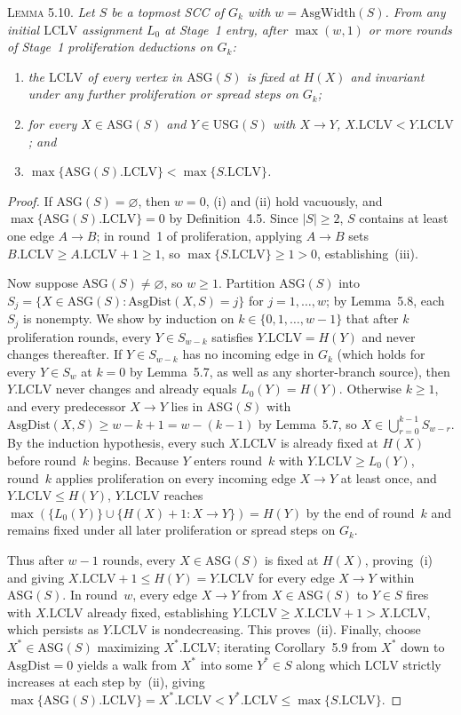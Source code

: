 \documentclass[sigconf,nonacm]{acmart}
\newcommand{\lclv}{\mathrm{LCLV}}
\newcommand{\usg}{\mathrm{USG}}
\newcommand{\asg}{\mathrm{ASG}}
\newcommand{\asgdist}{\mathrm{AsgDist}}
\newcommand{\asgwidth}{\mathrm{AsgWidth}}
\newcommand{\phead}[1]{\par\noindent\textsc{#1.}\enspace}
\begin{document}
\phead{Lemma 5.10}%
\emph{Let \(S\) be a topmost SCC of \(G_k\) with \(w=\asgwidth(S)\).
From any initial \(\lclv\) assignment \(L_0\) at Stage~1 entry, after
\(\max(w,1)\) or more rounds of Stage~1 proliferation deductions on
\(G_k\):}
\begin{enumerate}
  \item[\emph{(i)}] \emph{the \(\lclv\) of every vertex in \(\asg(S)\) is
    fixed at \(H(X)\) and invariant under any further proliferation or
    spread steps on \(G_k\);}
  \item[\emph{(ii)}] \emph{for every \(X\in\asg(S)\) and \(Y\in\usg(S)\)
    with \(X\to Y\), \(X.\lclv < Y.\lclv\); and}
  \item[\emph{(iii)}] \emph{\(\max\{\asg(S).\lclv\} < \max\{S.\lclv\}\).}
\end{enumerate}
\begin{proof}
If \(\asg(S)=\varnothing\), then \(w=0\), (i) and (ii) hold vacuously,
and \(\max\{\asg(S).\lclv\}=0\) by Definition~4.5. Since \(|S|\ge 2\),
\(S\) contains at least one edge \(A\to B\); in round~1 of
proliferation, applying \(A\to B\) sets \(B.\lclv\ge A.\lclv+1\ge 1\),
so \(\max\{S.\lclv\}\ge 1 > 0\), establishing~(iii).

Now suppose \(\asg(S)\neq\varnothing\), so \(w\ge 1\). Partition
\(\asg(S)\) into \(S_j=\{X\in\asg(S):\asgdist(X,S)=j\}\) for
\(j=1,\dots,w\); by Lemma~5.8, each \(S_j\) is nonempty. We show by
induction on \(k\in\{0,1,\dots,w-1\}\) that after \(k\) proliferation
rounds, every \(Y\in S_{w-k}\) satisfies \(Y.\lclv=H(Y)\) and never
changes thereafter. If \(Y\in S_{w-k}\) has no incoming edge in \(G_k\)
(which holds for every \(Y\in S_w\) at \(k=0\) by Lemma~5.7, as well as
any shorter-branch source), then \(Y.\lclv\) never changes and already
equals \(L_0(Y)=H(Y)\). Otherwise \(k\ge 1\), and every predecessor
\(X\to Y\) lies in \(\asg(S)\) with \(\asgdist(X,S)\ge w-k+1=w-(k-1)\)
by Lemma~5.7, so \(X\in\bigcup_{r=0}^{k-1} S_{w-r}\). By the induction
hypothesis, every such \(X.\lclv\) is already fixed at \(H(X)\) before
round~\(k\) begins. Because \(Y\) enters round~\(k\) with
\(Y.\lclv\ge L_0(Y)\), round~\(k\) applies proliferation on every
incoming edge \(X\to Y\) at least once, and \(Y.\lclv\le H(Y)\),
\(Y.\lclv\) reaches \(\max(\{L_0(Y)\}\cup\{H(X)+1:X\to Y\})=H(Y)\) by
the end of round~\(k\) and remains fixed under all later proliferation
or spread steps on \(G_k\).

Thus after \(w-1\) rounds, every \(X\in\asg(S)\) is fixed at \(H(X)\),
proving~(i) and giving \(X.\lclv+1\le H(Y)=Y.\lclv\) for every edge
\(X\to Y\) within \(\asg(S)\). In round~\(w\), every edge \(X\to Y\)
from \(X\in\asg(S)\) to \(Y\in S\) fires with \(X.\lclv\) already fixed,
establishing \(Y.\lclv\ge X.\lclv+1 > X.\lclv\), which persists as
\(Y.\lclv\) is nondecreasing. This proves~(ii). Finally, choose
\(X^*\in\asg(S)\) maximizing \(X^*.\lclv\); iterating Corollary~5.9 from
\(X^*\) down to \(\asgdist=0\) yields a walk from \(X^*\) into some
\(Y^*\in S\) along which \(\lclv\) strictly increases at each step
by~(ii), giving \(\max\{\asg(S).\lclv\}=X^*.\lclv < Y^*.\lclv \le
\max\{S.\lclv\}\).
\end{proof}
\end{document}
